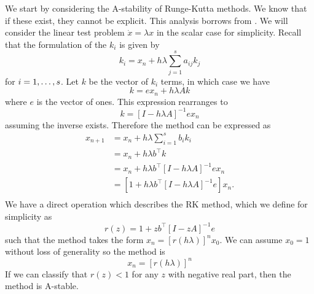 We start by considering the A-stability of Runge-Kutta methods.
We know that if these exist, they cannot be explicit.
This analysis borrows from \cite{iserles2009rk}.
We will consider the linear test problem $\dot{x} = \lambda x$ in the scalar case for simplicity.
Recall that the formulation of the $k_i$ is given by
\begin{equation*}
	k_i = x_n + h \lambda \sum_{j=1}^{s}a_{ij}k_j
\end{equation*}
for $i = 1, \mathellipsis, s$.
Let $k$ be the vector of $k_i$ terms, in which case we have
\begin{equation*}
	k = e x_n + h \lambda A k
\end{equation*}
where $e$ is the vector of ones. This expression rearranges to
\begin{equation*}
	k = \left[ I - h \lambda A \right]^{-1} e x_n
\end{equation*}
assuming the inverse exists.
Therefore the method can be expressed as 
\begin{align*}
	x_{n+1} &= x_n + h \lambda \sum_{i=1}^{s} b_i k_i \\
	&= x_n + h \lambda b^\top k \\
	&= x_n + h \lambda b^\top \left[ I - h \lambda A \right]^{-1} e x_n \\
	&= \left[ 1 + h \lambda b^\top \left[ I - h \lambda A \right]^{-1} e \right] x_n. \\
\end{align*}
We have a direct operation which describes the RK method,
which we define for simplicity as
\begin{equation}
	r(z) = 1 + z b^\top \left[ I - z A \right]^{-1} e
	\label{eqn:rkstab}
\end{equation}
such that the method takes the form $x_n = [r(h \lambda)]^n x_0$.
We can assume $x_0=1$ without loss of generality so the method is
\begin{equation*}
	x_n = [r(h \lambda)]^n
\end{equation*}
If we can classify that $r(z)<1$ for any $z$ with negative real part,
then the method is A-stable.

